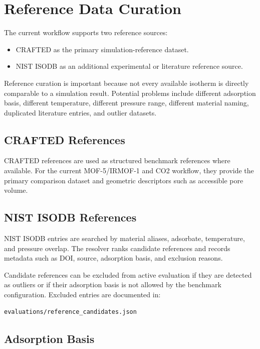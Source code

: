 \section{Reference Data Curation}

The current workflow supports two reference sources:

\begin{itemize}
    \item CRAFTED as the primary simulation-reference dataset.
    \item NIST ISODB as an additional experimental or literature reference source.
\end{itemize}

Reference curation is important because not every available isotherm is directly comparable to a simulation result.
Potential problems include different adsorption basis, different temperature, different pressure range, different material naming, duplicated literature entries, and outlier datasets.

\subsection{CRAFTED References}

CRAFTED references are used as structured benchmark references where available.
For the current MOF-5/IRMOF-1 and CO2 workflow, they provide the primary comparison dataset and geometric descriptors such as accessible pore volume.

\subsection{NIST ISODB References}

NIST ISODB entries are searched by material aliases, adsorbate, temperature, and pressure overlap.
The resolver ranks candidate references and records metadata such as DOI, source, adsorption basis, and exclusion reasons.

Candidate references can be excluded from active evaluation if they are detected as outliers or if their adsorption basis is not allowed by the benchmark configuration.
Excluded entries are documented in:

\begin{lstlisting}
evaluations/reference_candidates.json
\end{lstlisting}

\subsection{Adsorption Basis}

